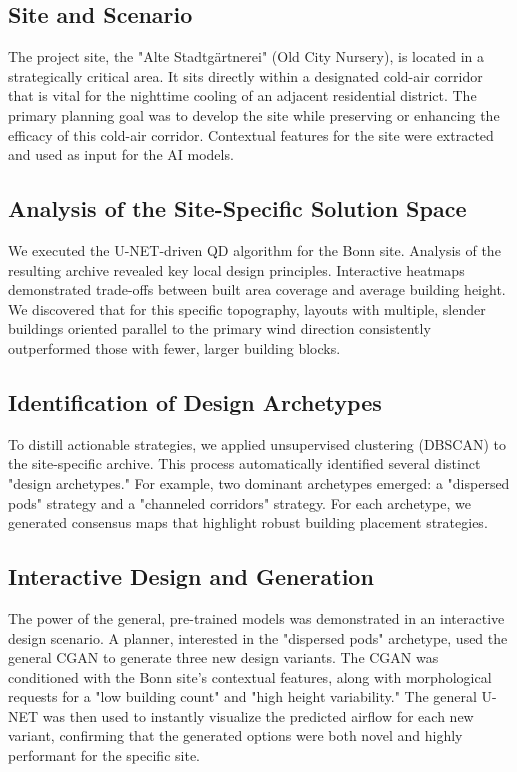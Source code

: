 \documentclass[times,final]{elsarticle}
\begin{document}
\subsection{Site and Scenario}
The project site, the "Alte Stadtgärtnerei" (Old City Nursery), is located in a strategically critical area. It sits directly within a designated cold-air corridor that is vital for the nighttime cooling of an adjacent residential district. The primary planning goal was to develop the site while preserving or enhancing the efficacy of this cold-air corridor. Contextual features for the site were extracted and used as input for the AI models.

\subsection{Analysis of the Site-Specific Solution Space}
We executed the U-NET-driven QD algorithm for the Bonn site. Analysis of the resulting archive revealed key local design principles. Interactive heatmaps demonstrated trade-offs between built area coverage and average building height. We discovered that for this specific topography, layouts with multiple, slender buildings oriented parallel to the primary wind direction consistently outperformed those with fewer, larger building blocks. 

\subsection{Identification of Design Archetypes}
To distill actionable strategies, we applied unsupervised clustering (DBSCAN) to the site-specific archive. This process automatically identified several distinct "design archetypes." For example, two dominant archetypes emerged: a "dispersed pods" strategy and a "channeled corridors" strategy. For each archetype, we generated consensus maps that highlight robust building placement strategies. 

\subsection{Interactive Design and Generation}
The power of the general, pre-trained models was demonstrated in an interactive design scenario. A planner, interested in the "dispersed pods" archetype, used the general CGAN to generate three new design variants. The CGAN was conditioned with the Bonn site's contextual features, along with morphological requests for a "low building count" and "high height variability." The general U-NET was then used to instantly visualize the predicted airflow for each new variant, confirming that the generated options were both novel and highly performant for the specific site. 
\end{document}
